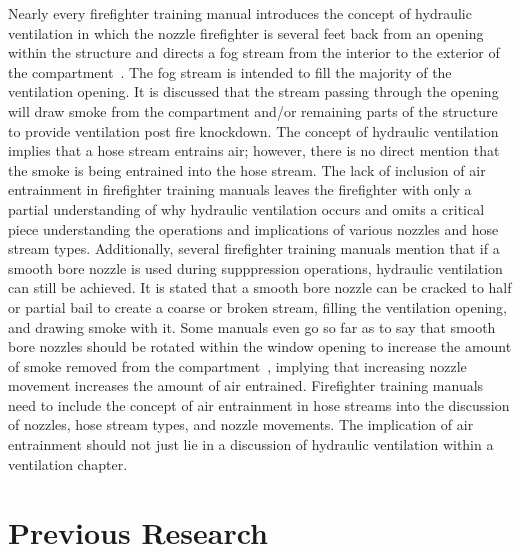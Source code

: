 \documentclass[12pt,oneside]{book}
\begin{document}
Nearly every firefighter training manual introduces the concept of hydraulic ventilation in which the nozzle firefighter is several feet back from an opening within the structure and directs a fog stream from the interior to the exterior of the compartment~\cite{Essentials6,FEHandbook}. The fog stream is intended to fill the majority of the ventilation opening. It is discussed that the stream passing through the opening will draw smoke from the compartment and/or remaining parts of the structure to provide ventilation post fire knockdown. The concept of hydraulic ventilation implies that a hose stream entrains air; however, there is no direct mention that the smoke is being entrained into the hose stream. The lack of inclusion of air entrainment in firefighter training manuals leaves the firefighter with only a partial understanding of why hydraulic ventilation occurs and omits a critical piece understanding the operations and implications of various nozzles and hose stream types. Additionally, several firefighter training manuals mention that if a smooth bore nozzle is used during supppression operations, hydraulic ventilation can still be achieved. It is stated that a smooth bore nozzle can be cracked to half or partial bail to create a coarse or broken stream, filling the ventilation opening, and drawing smoke with it. Some manuals even go so far as to say that smooth bore nozzles should be rotated within the window opening to increase the amount of smoke removed from the compartment~\cite{FEHandbook}, implying that increasing nozzle movement increases the amount of air entrained. Firefighter training manuals need to include the concept of air entrainment in hose streams into the discussion of nozzles, hose stream types, and nozzle movements. The implication of air entrainment should not just lie in a discussion of hydraulic ventilation within a ventilation chapter.

\section*{Previous Research}
\end{document}
